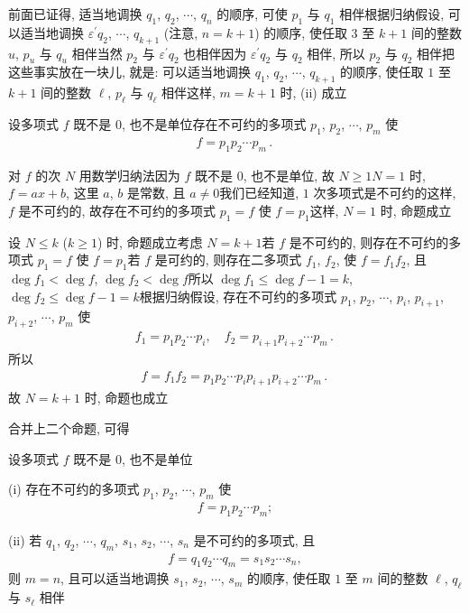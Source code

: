 \begin{pf}
    前面已证得, 适当地调换 $q_1$, $q_2$, $\cdots$, $q_n$ 的顺序, 可使 $p_1$ 与 $q_1$ 相伴\period 根据归纳假设, 可以适当地调换 $\varepsilon^{\prime} q_2$, $\cdots$, $q_{k+1}$ (注意, $n = k+1$) 的顺序, 使任取 $3$ 至 $k+1$ 间的整数 $u$, $p_u$ 与 $q_u$ 相伴\period 当然 $p_2$ 与 $\varepsilon^{\prime} q_2$ 也相伴\period 因为 $\varepsilon^{\prime} q_2$ 与 $q_2$ 相伴, 所以 $p_2$ 与 $q_2$ 相伴\period 把这些事实放在一块儿, 就是: 可以适当地调换 $q_1$, $q_2$, $\cdots$, $q_{k+1}$ 的顺序, 使任取 $1$ 至 $k+1$ 间的整数 $\ell$, $p_{\ell}$ 与 $q_{\ell}$ 相伴\period 这样, $m = k+1$ 时, (ii) 成立\period
\end{pf}

\begin{proposition}
    设多项式 $f$ 既不是 $0$, 也不是单位\period 存在不可约的多项式 $p_1$, $p_2$, $\cdots$, $p_m$ 使
    \begin{align*}
        f = p_1 p_2 \cdots p_m \period
    \end{align*}
\end{proposition}

\begin{pf}
    对 $f$ 的次 $N$ 用数学归纳法\period 因为 $f$ 既不是 $0$, 也不是单位, 故 $N \geq 1$\period $N = 1$ 时, $f = ax + b$, 这里 $a$, $b$ 是常数, 且 $a \neq 0$\period 我们已经知道, $1$ 次多项式是不可约的\period 这样, $f$ 是不可约的, 故存在不可约的多项式 $p_1 = f$ 使 $f = p_1$\period 这样, $N = 1$ 时, 命题成立\period

    设 $N \leq k$ ($k \geq 1$) 时, 命题成立\period 考虑 $N = k+1$\period 若 $f$ 是不可约的, 则存在不可约的多项式 $p_1 = f$ 使 $f = p_1$\period 若 $f$ 是可约的, 则存在二多项式 $f_1$, $f_2$, 使 $f = f_1 f_2$, 且 $\deg f_1 < \deg f$, $\deg f_2 < \deg f$\period 所以 $\deg f_1 \leq \deg f - 1 = k$, $\deg f_2 \leq \deg f - 1 = k$\period 根据归纳假设, 存在不可约的多项式 $p_1$, $p_2$, $\cdots$, $p_i$, $p_{i+1}$, $p_{i+2}$, $\cdots$, $p_m$ 使
    \begin{align*}
        f_1 = p_1 p_2 \cdots p_i, \quad f_2 = p_{i+1} p_{i+2} \cdots p_m \period
    \end{align*}
    所以
    \begin{align*}
        f = f_1 f_2 = p_1 p_2 \cdots p_i p_{i+1} p_{i+2} \cdots p_m \period
    \end{align*}
    故 $N = k+1$ 时, 命题也成立\period
\end{pf}

合并上二个命题, 可得
\begin{proposition}
    设多项式 $f$ 既不是 $0$, 也不是单位\period

    (i) 存在不可约的多项式 $p_1$, $p_2$, $\cdots$, $p_m$ 使
    \begin{align*}
        f = p_1 p_2 \cdots p_m;
    \end{align*}

    (ii) 若 $q_1$, $q_2$, $\cdots$, $q_m$, $s_1$, $s_2$, $\cdots$, $s_n$ 是不可约的多项式, 且
    \begin{align*}
        f = q_1 q_2 \cdots q_m = s_1 s_2 \cdots s_n,
    \end{align*}
    则 $m = n$, 且可以适当地调换 $s_1$, $s_2$, $\cdots$, $s_m$ 的顺序, 使任取 $1$ 至 $m$ 间的整数 $\ell$, $q_\ell$ 与 $s_\ell$ 相伴\period
\end{proposition}

